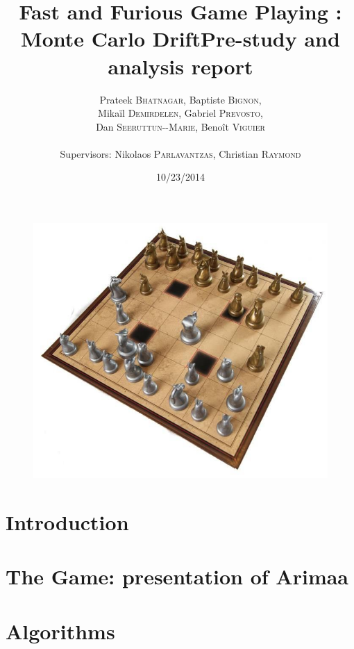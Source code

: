 \documentclass[12pt]{article}
\title{Fast and Furious Game Playing : Monte Carlo Drift\smallbreak Pre-study and analysis report}
\author{Prateek \textsc{Bhatnagar}, Baptiste \textsc{Bignon}, \\
        Mikaïl \textsc{Demirdelen}, Gabriel \textsc{Prevosto}, \\
        Dan \textsc{Seeruttun-{}-Marie}, Benoît \textsc{Viguier} \\
        \\
        Supervisors: Nikolaos \textsc{Parlavantzas}, Christian \textsc{Raymond}}
\date{10/23/2014}
\begin{document}
\maketitle

\begin{figure}[!h] 
\centerline{\includegraphics[scale=0.50]{img/arimaa}}
\end{figure}
\newpage
\begin{abstract}

\end{abstract}



\newpage
\tableofcontents
\newpage


\section{Introduction}

\section{The Game: presentation of Arimaa}


\section{Algorithms}

\end{document}

